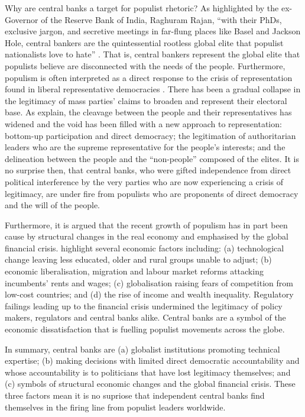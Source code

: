 \documentclass[11pt]{article}
\begin{document}
Why are central banks a target for populist rhetoric? As highlighted by the ex-Governor of the Reserve Bank of India, Raghuram Rajan, ``with their PhDs, exclusive jargon, and secretive meetings in far-flung places like Basel and Jackson Hole, central bankers are the quintessential rootless global elite that populist nationalists love to hate'' \citep{rajan2017central}. That is, central bankers represent the global elite that populists believe are disconnected with the needs of the people. Furthermore, populism is often interpreted as a direct response to the crisis of representation found in liberal representative democracies \citep{de2018populism}. There has been a gradual collapse in the legitimacy of mass parties' claims to broaden and represent their electoral base.  As \cite{de2018populism} explain, the cleavage between the people and their representatives has widened and the void has been filled with a new approach to representation: bottom-up participation and direct democracy; the legitimation of authoritarian leaders who are the supreme representative for the people's interests; and the delineation between the people and the ``non-people'' composed of the elites. It is no surprise then, that central banks, who were gifted independence from direct political interference by the very parties who are now experiencing a crisis of legitimacy, are under fire from populists who are proponents of direct democracy and the will of the people. 

Furthermore, it is argued that the recent growth of populism has in part been cause by structural changes in the real economy and emphasised by the global financial crisis. \citep{gnan2020populism} highlight several economic factors including: (a) technological change leaving less educated, older and rural groups unable to adjust; (b) economic liberalisation, migration and labour market reforms attacking incumbents’ rents and wages; (c) globalisation raising fears of competition from low-cost countries; and (d) the rise of income and wealth inequality. Regulatory failings leading up to the financial crisis \citep{turner12017did} undermined the legitimacy of policy makers, regulators and central banks alike. Central banks are a symbol of the economic dissatisfaction that is fuelling populist movements across the globe.

In summary, central banks are (a) globalist institutions promoting technical expertise; (b) making decisions with limited direct democratic accountability and whose accountability is to politicians that have lost legitimacy themselves; and (c) symbols of structural economic changes and the global financial crisis. These three factors mean it is no supriose that independent central banks find themselves in the firing line from populist leaders worldwide.
\end{document}
